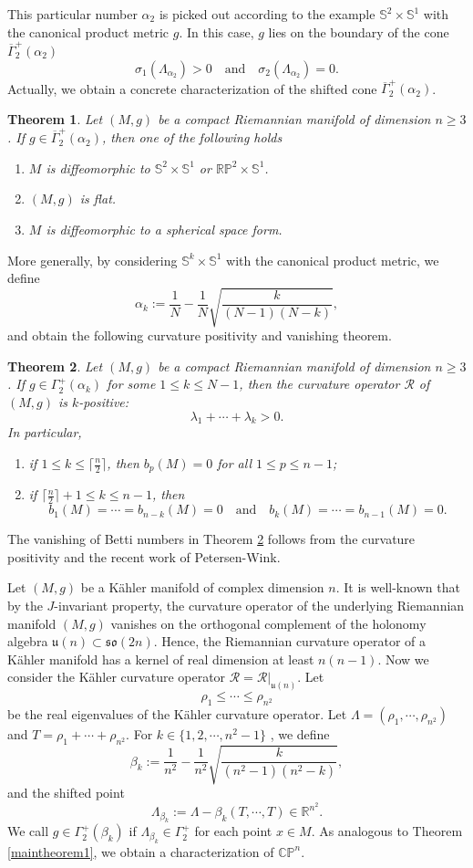 \documentclass[12pt]{amsart}
\theoremstyle{plain}
\newtheorem{thm}{Theorem}[section]
\theoremstyle{definition}
\newcommand{\btheorem}{\begin{thm}}
\newcommand{\etheorem}{\end{thm}}
\renewcommand{\bar}{\overline}
\newcommand{\beq}{\begin{equation}}
\newcommand{\eeq}{\end{equation}}
\newcommand{\bd}{\begin{enumerate}}
\newcommand{\ed}{\end{enumerate}}
\newcommand{\qtq}[1]{\quad\mbox{#1}\quad}
\renewcommand{\S}{{\mathbb S}}
\renewcommand{\>}{\rightarrow}
\newcommand{\C}{{\mathbb C}}
\renewcommand{\P}{{\mathbb P}}
\newcommand{\R}{{\mathbb R}}
\numberwithin{equation}{section} %
\begin{document}
\noindent This particular number $\alpha_2$ is picked out according to the example $\S^2\times \S^1$ with the canonical product metric $g$. In this case, $g$ lies on the boundary of the cone $\bar \Gamma_2^+(\alpha_2)$  $$\sigma_1(\Lambda_{\alpha_2})>0 \qtq{and} \sigma_2(\Lambda_{\alpha_2})=0.$$
Actually, we obtain a concrete characterization of the  shifted cone $\bar\Gamma_2^+(\alpha_2)$.

\btheorem\label{maintheorem2}
 Let $(M,g)$ be a compact Riemannian manifold of dimension $n\geq 3$. If $g\in \bar \Gamma_2^+(\alpha_2)$, then one of the following holds \bd
\item  $M$ is diffeomorphic to  $\mathbb S^2\times \mathbb S^1$ or $\mathbb R\mathbb P^2\times \S^1$. 
 \item  $(M,g)$ is flat.
\item  $M$ is diffeomorphic to a spherical space form.
\ed
\etheorem


\noindent  More generally,  by considering  $\S^{k}\times \S^1$ with the canonical product metric, we define 
	\beq \alpha_k:=\frac{1}{N}-\frac{1}{N}\sqrt{\frac{k}{(N-1)(N-k)}}, \label{alphak}\eeq 
	and obtain the following curvature positivity and vanishing theorem. 
\btheorem\label{maintheorem3}
 Let $(M,g)$ be a compact Riemannian manifold of dimension $n\geq 3$.  If $g\in {\Gamma}_2^+(\alpha_k)$ for some $1\leq k\leq N-1$,  then  the curvature operator $\mathscr R$ of $(M,g)$ is $k$-positive:
 $$\lambda_1+\cdots+\lambda_k>0.$$
  In particular, \bd
 	\item if $1\leq k\leq\lceil\frac{n}{2}\rceil$, then $b_p(M)=0$ for all $1\leq p\leq n-1$;
 	\item if $\lceil\frac{n}{2}\rceil+1\leq k\leq n-1$, then $$b_1(M)=\cdots=b_{n-k}(M)=0 \qtq{and} b_{k}(M)=\cdots =b_{n-1}(M)=0.$$
 \ed
\etheorem
\noindent 
The vanishing of Betti numbers in Theorem \ref{maintheorem3}   follows from the curvature positivity and the recent work \cite{PetersenWink2021a} of Petersen-Wink. 
	\baselineskip
	
	Let $(M,g)$ be a K\"ahler manifold of complex dimension $n$. It is well-known that by the $J$-invariant property, the curvature operator of the underlying Riemannian manifold $(M,g)$ vanishes on the orthogonal complement of the holonomy algebra $\mathfrak u(n)\subset \mathfrak{so}(2n)$. Hence, the Riemannian curvature operator of a Kähler manifold has a kernel of real
	dimension at least $n(n-1)$. Now we consider the K\"ahler curvature operator  $\mathscr R=\mathscr R|_{\mathfrak{u}(n)}$. Let 
	$$\rho_1\leq \cdots \leq \rho_{n^2}$$
	be the real eigenvalues of the K\"ahler curvature operator. Let $\Lambda=(\rho_1,\cdots, \rho_{n^2})$ and $T=\rho_1+\cdots +\rho_{n^2}$. For
	$k\in\{1,2,\cdots,n^2-1\}$ , we define \beq \beta_k:=\frac{1}{n^2}-\frac{1}{n^2}\sqrt{\frac{k}{(n^2-1)(n^2-k)}}, \eeq and the shifted point \beq \Lambda _{\beta_k}:=\Lambda-\beta_k(T,\cdots,T)\in \R^{n^2}. \eeq 
 We call $g\in \Gamma_2^+(\beta_k)$ if $\Lambda_{\beta_k}\in \Gamma_2^+$ for each point $x\in M$. As analogous to Theorem \ref{maintheorem1}, we obtain a characterization of $\C\P^n$.
 
\end{document}
